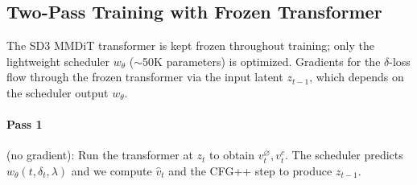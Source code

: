 \documentclass[acmtog]{acmart}
\begin{document}










\subsection{Two-Pass Training with Frozen Transformer}

The SD3 MMDiT transformer is kept frozen throughout training; only the lightweight scheduler $w_\theta$ ($\sim$50K parameters) is optimized. Gradients for the $\delta$-loss flow through the frozen transformer via the input latent $z_{t-1}$, which depends on the scheduler output $w_\theta$.

\paragraph{Pass 1} (no gradient): Run the transformer at $z_t$ to obtain $v_t^{\varnothing}, v_t^{c}$. The scheduler predicts $w_\theta(t, \delta_t, \lambda)$ and we compute $\hat{v}_t$ and the CFG++ step to produce $z_{t-1}$.
\end{document}
